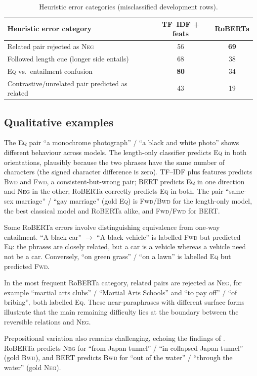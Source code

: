 \documentclass[11pt,a4paper]{article}
\newcommand{\EQ}{\textsc{Eq}}
\newcommand{\FWD}{\textsc{Fwd}}
\newcommand{\BWD}{\textsc{Bwd}}
\newcommand{\NEG}{\textsc{Neg}}
\begin{document}
\begin{table}[t]
\centering
\small
\begin{tabular}{lcc}
\toprule
Heuristic error category & TF--IDF + feats & RoBERTa \\
\midrule
Related pair rejected as \NEG & 56 & \textbf{69} \\
Followed length cue (longer side entails) & 68 & 38 \\
\EQ{} vs.\ entailment confusion & \textbf{80} & 34 \\
Contrastive/unrelated pair predicted as related & 43 & 19 \\
\bottomrule
\end{tabular}
\caption{Heuristic error categories (misclassified development rows).}
\label{tab:errtypes}
\end{table}

\subsection{Qualitative examples}
The \EQ{} pair ``a monochrome photograph'' / ``a black and white photo'' shows different behaviour across models. The length-only classifier predicts \EQ{} in both orientations, plausibly because the two phrases have the same number of characters (the signed character difference is zero). TF--IDF plus features predicts \BWD{} and \FWD{}, a consistent-but-wrong pair; BERT predicts \EQ{} in one direction and \NEG{} in the other; RoBERTa correctly predicts \EQ{} in both. The pair ``same-sex marriage'' / ``gay marriage'' (gold \EQ) is \FWD/\BWD{} for the length-only model, the best classical model and RoBERTa alike, and \FWD/\FWD{} for BERT.

Some RoBERTa errors involve distinguishing equivalence from one-way entailment. ``A black car'' $\rightarrow$ ``A black vehicle'' is labelled \FWD{} but predicted \EQ{}: the phrases are closely related, but a car is a vehicle whereas a vehicle need not be a car. Conversely, ``on green grass'' / ``on a lawn'' is labelled \EQ{} but predicted \FWD.

In the most frequent RoBERTa category, related pairs are rejected as \NEG{}, for example ``martial arts clubs'' / ``Martial Arts Schools'' and ``to pay off'' / ``of bribing'', both labelled \EQ{}. These near-paraphrases with different surface forms illustrate that the main remaining difficulty lies at the boundary between the reversible relations and \NEG.

Prepositional variation also remains challenging, echoing the findings of \citet{apaolaza2026assessing}. RoBERTa predicts \NEG{} for ``from Japan tunnel'' / ``in collapsed Japan tunnel'' (gold \BWD), and BERT predicts \BWD{} for ``out of the water'' / ``through the water'' (gold \NEG).
\end{document}
